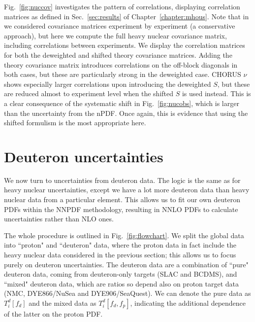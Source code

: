 Fig.~\ref{fig:nuccov} investigates the pattern of correlations, displaying correlation matrices as defined in Sec.~\ref{sec:results} of Chapter~\ref{chapter:mhous}. Note that in \cite{Ball:2018twp} we considered covariance matrices experiment by experiment (a conservative approach), but here we compute the full heavy nuclear covariance matrix, including correlations between experiments. We display the correlation matrices for both the deweighted and shifted theory covariance matrices. Adding the theory covariance matrix introduces correlations on the off-block diagonals in both cases, but these are particularly strong in the deweighted case. CHORUS $\nu$ shows especially larger correlations upon introducing the deweighted $S$, but these are reduced almost to experiment level when the shifted $S$ is used instead. This is a clear consequence of the systematic shift in Fig.~\ref{fig:nucobs}, which is larger than the uncertainty from the nPDF. Once again, this is evidence that using the shifted formulism is the most appropriate here.

\section{Deuteron uncertainties}
\label{sec:deutunc}
We now turn to uncertainties from deuteron data. The logic is the same as for heavy nuclear uncertainties, except we have a lot more deuteron data than heavy nuclear data from a particular element. This allows us to fit our own deuteron PDFs within the NNPDF methodology, resulting in NNLO PDFs to calculate uncertainties rather than NLO ones. 

The whole procedure is outlined in Fig.~\ref{fig:flowchart}. We split the global data into ``proton" and ``deuteron" data, where the proton data in fact include the heavy nuclear data considered in the previous section; this allows us to focus purely on deuteron uncertainties. The deuteron data are a combination of ``pure" deuteron data, coming from deuteron-only targets (SLAC and BCDMS), and ``mixed" deuteron data, which are ratios so depend also on proton target data (NMC, DYE866/NuSea and DYE906/SeaQuest). We can denote the pure data as $T_i^d[f_d]$ and the mixed data as $T_i^d[f_d, f_p]$, indicating the additional dependence of the latter on the proton PDF.

